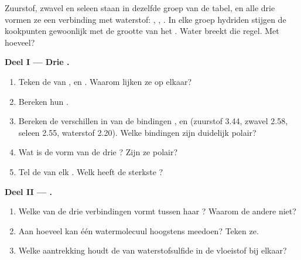 \begin{problem}
\label{pb:g11:polarity-and-cohesion:1}
Zuurstof, zwavel en seleen staan in dezelfde groep van de tabel, en alle
drie vormen ze een verbinding met waterstof: , ,
. In elke groep hydriden stijgen de kookpunten gewoonlijk met de
grootte van het . Water breekt die regel. Met hoeveel?

\medskip
\noindent\textbf{Deel I --- Drie .}
\begin{enumerate}
  \item Teken de  van ,  en .
        Waarom lijken ze op elkaar?
  \item Bereken hun .
  \item Bereken de verschillen in  van de bindingen
        ,  en  (zuurstof 3.44, zwavel 2.58,
        seleen 2.55, waterstof 2.20). Welke bindingen zijn duidelijk
        polair?
  \item Wat is de vorm van de drie ? Zijn ze polair?
  \item Tel de  van elk . Welk heeft de sterkste
        ?
\end{enumerate}

\medskip
\noindent\textbf{Deel II --- .}
\begin{enumerate}[resume]
  \item Welke van de drie verbindingen vormt  tussen haar
        ? Waarom de andere niet?
  \item Aan hoeveel  kan één watermolecuul hoogstens
        meedoen? Teken ze.
  \item Welke aantrekking houdt de  van waterstofsulfide in de
        vloeistof bij elkaar?
\end{enumerate}


\end{problem}
